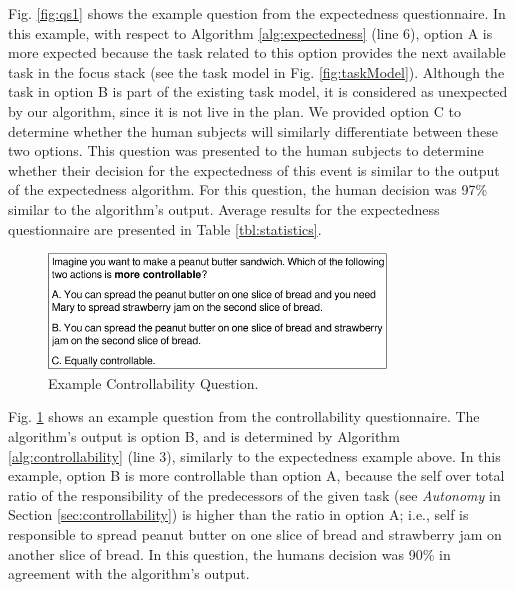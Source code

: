 Fig. \ref{fig:qs1} shows the example question from the expectedness
questionnaire. In this example, with respect to Algorithm
\ref{alg:expectedness} (line 6), option A is more expected because the task
related to this option provides the next available task in the focus stack (see
the task model in Fig. \ref{fig:taskModel}). Although the task in option B is
part of the existing task model, it is considered as unexpected by our
algorithm, since it is not live in the plan. We provided option C to determine
whether the human subjects will similarly differentiate between these two
options. This question was presented to the human subjects to determine whether
their decision for the expectedness of this event is similar to the output of
the expectedness algorithm. For this question, the human decision was 97\%
similar to the algorithm's output. Average results for the expectedness
questionnaire are presented in Table \ref{tbl:statistics}.

\begin{figure}[t]
  \vspace{-1mm}
  \centering
  \includegraphics[width=0.8\textwidth]{figure/question-sample2-croped.pdf}
  \caption{{\fontsize{9}{9}\selectfont Example Controllability Question.}}
  \label{fig:qs2}
  \vspace{-2mm}
\end{figure}

Fig. \ref{fig:qs2} shows an example question from the controllability
questionnaire. The algorithm's output is option B, and is determined by
Algorithm \ref{alg:controllability} (line 3), similarly to the expectedness
example above. In this example, option B is more controllable than option A,
because the self over total ratio of the responsibility of the predecessors of
the given task (see \textit{Autonomy} in Section \ref{sec:controllability}) is
higher than the ratio in option A; i.e., self is responsible to spread peanut
butter on one slice of bread and strawberry jam on another slice of bread. In
this question, the humans decision was 90\% in agreement with the algorithm's
output.

